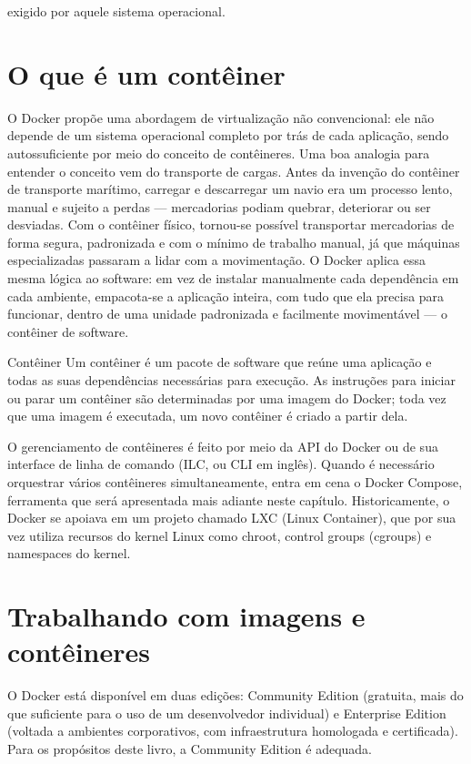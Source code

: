 exigido por aquele sistema operacional.

\section{O que é um contêiner}

O Docker propõe uma abordagem de virtualização não convencional: ele não depende de um sistema operacional completo por trás de cada aplicação, sendo autossuficiente por meio do conceito de contêineres. Uma boa analogia para entender o conceito vem do transporte de cargas. Antes da invenção do contêiner de transporte marítimo, carregar e descarregar um navio era um processo lento, manual e sujeito a perdas — mercadorias podiam quebrar, deteriorar ou ser desviadas. Com o contêiner físico, tornou-se possível transportar mercadorias de forma segura, padronizada e com o mínimo de trabalho manual, já que máquinas especializadas passaram a lidar com a movimentação. O Docker aplica essa mesma lógica ao software: em vez de instalar manualmente cada dependência em cada ambiente, empacota-se a aplicação inteira, com tudo que ela precisa para funcionar, dentro de uma unidade padronizada e facilmente movimentável — o contêiner de software.

\begin{infobox}{Contêiner}
Um contêiner é um pacote de software que reúne uma aplicação e todas as suas dependências necessárias para execução. As instruções para iniciar ou parar um contêiner são determinadas por uma imagem do Docker; toda vez que uma imagem é executada, um novo contêiner é criado a partir dela.
\end{infobox}

O gerenciamento de contêineres é feito por meio da API do Docker ou de sua interface de linha de comando (ILC, ou CLI em inglês). Quando é necessário orquestrar vários contêineres simultaneamente, entra em cena o Docker Compose, ferramenta que será apresentada mais adiante neste capítulo. Historicamente, o Docker se apoiava em um projeto chamado LXC (Linux Container), que por sua vez utiliza recursos do kernel Linux como chroot, control groups (cgroups) e namespaces do kernel.

\section{Trabalhando com imagens e contêineres}

O Docker está disponível em duas edições: Community Edition (gratuita, mais do que suficiente para o uso de um desenvolvedor individual) e Enterprise Edition (voltada a ambientes corporativos, com infraestrutura homologada e certificada). Para os propósitos deste livro, a Community Edition é adequada.

